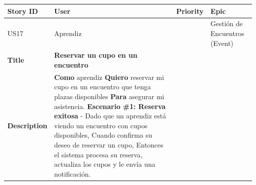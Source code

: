 {\def\LTcaptype{none} %
\begin{longtable}[]{@{}
  >{\raggedright\arraybackslash}p{}
  >{\raggedright\arraybackslash}p{}
  >{\raggedright\arraybackslash}p{}
  >{\raggedright\arraybackslash}p{}@{}}
\toprule\noalign{}
\begin{minipage}[b]{\linewidth}\raggedright
Story ID
\end{minipage} & \begin{minipage}[b]{\linewidth}\raggedright
User
\end{minipage} & \begin{minipage}[b]{\linewidth}\raggedright
Priority
\end{minipage} & \begin{minipage}[b]{\linewidth}\raggedright
Epic
\end{minipage} \\
\midrule\noalign{}
\endhead
\bottomrule\noalign{}
\endlastfoot
US17 & Aprendiz & 5 & Gestión de Encuentros (Event) \\
\textbf{Title} & \textbf{Reservar un cupo en un encuentro} & & \\
\textbf{Description} & \textbf{Como} aprendiz \textbf{Quiero} reservar
mi cupo en un encuentro que tenga plazas disponibles \textbf{Para}
asegurar mi asistencia. \textbf{Escenario \#1: Reserva exitosa} - Dado
que un aprendiz está viendo un encuentro con cupos disponibles, Cuando
confirma su deseo de reservar un cupo, Entonces el sistema procesa su
reserva, actualiza los cupos y le envía una notificación. & & \\
\end{longtable}
}

